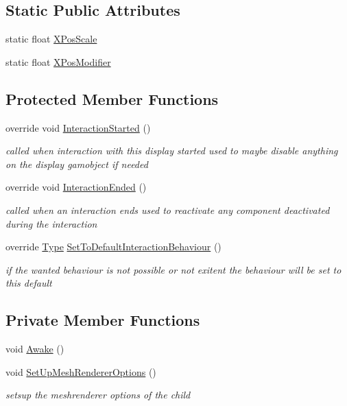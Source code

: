\subsection*{Static Public Attributes}
\begin{DoxyCompactItemize}
\item 
static float \mbox{\hyperlink{class_mesh_display_a13c5ad03c68d0b4519bfb8ca23ac6f11}{X\+Pos\+Scale}}
\item 
static float \mbox{\hyperlink{class_mesh_display_a6b33d912f5f2abd389f3feb3af1ce621}{X\+Pos\+Modifier}}
\end{DoxyCompactItemize}
\subsection*{Protected Member Functions}
\begin{DoxyCompactItemize}
\item 
override void \mbox{\hyperlink{class_mesh_display_aa4affc65c23027c877f511fc2b8aaeb8}{Interaction\+Started}} ()
\begin{DoxyCompactList}\small\item\em called when interaction with this display started used to maybe disable anything on the display gamobject if needed \end{DoxyCompactList}\item 
override void \mbox{\hyperlink{class_mesh_display_a23f7ab8b0f48536940ad1cc2145297b3}{Interaction\+Ended}} ()
\begin{DoxyCompactList}\small\item\em called when an interaction ends used to reactivate any component deactivated during the interaction \end{DoxyCompactList}\item 
override \mbox{\hyperlink{class_display_a2c80ba13fff1fd81aaa6915b28e8c14f}{Type}} \mbox{\hyperlink{class_mesh_display_a8cd58e07cb9d64598c3bbc6701515d1d}{Set\+To\+Default\+Interaction\+Behaviour}} ()
\begin{DoxyCompactList}\small\item\em if the wanted behaviour is not possible or not exitent the behaviour will be set to this default \end{DoxyCompactList}\end{DoxyCompactItemize}
\subsection*{Private Member Functions}
\begin{DoxyCompactItemize}
\item 
void \mbox{\hyperlink{class_mesh_display_a13c3b8325ff12c302510a38ead46aba3}{Awake}} ()
\item 
void \mbox{\hyperlink{class_mesh_display_ab87e001316410059093fac5d92326ef2}{Set\+Up\+Mesh\+Renderer\+Options}} ()
\begin{DoxyCompactList}\small\item\em setsup the meshrenderer options of the child \end{DoxyCompactList}\end{DoxyCompactItemize}
